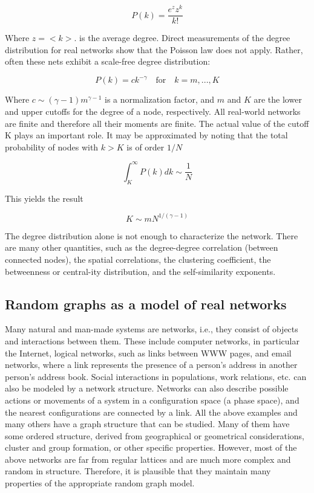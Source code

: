 \documentclass[12pt]{article}
\newcommand{\s}{\vspace*{0.4cm}}
\newcommand{\nd}{\noindent}
\begin{document}
\begin{equation}
    P(k) = \frac{e^{z} z^k}{k!}
\end{equation}

\nd Where $z = <k>$. is the average degree. \s Direct measurements of the degree distribution for real networks show that the Poisson law does not apply. Rather, often these nets exhibit a scale-free degree distribution:

\begin{equation}
    P(k) = ck^{-\gamma} \quad \text{for} \quad k = m, ... , K
\end{equation}

\nd Where $c \sim (\gamma -1)m^{\gamma - 1}$ is a normalization factor, and $m$ and $K$ are the lower and upper cutoffs for the degree of a node, respectively. All real-world networks are finite and therefore all their moments are finite. The
actual value of the cutoff K plays an important role. It may be approximated by noting that the total probability of nodes with $k > K$ is of order $1/N$

\begin{equation}
    \int_K^\infty P(k) dk \sim \frac{1}{N}
\end{equation}

\nd This yields the result

\begin{equation}
    K \sim m N^{1/(\gamma -1)}
\end{equation}

The degree distribution alone is not enough to characterize the network. There are many other quantities, such as the degree-degree correlation (between connected nodes), the spatial correlations, the clustering coefficient, the betweenness or central-ity distribution, and the self-similarity exponents.

\subsection{Random graphs as a model of real networks}

\nd Many natural and man-made systems are networks, i.e., they consist of objects and interactions between them. These include computer networks, in particular the Internet, logical networks, such as links between WWW pages, and email networks, where a link represents the presence of a person's address in another person's address book. Social interactions in populations, work relations, etc. can also be modeled by a network structure. Networks can also describe possible actions or movements of a system in a configuration space (a phase space), and the nearest configurations are connected by a link. All the above examples and many others have a graph structure that can be studied. Many of them have some ordered structure, derived from geographical or geometrical considerations, cluster and group formation, or other specific properties.  However, most of the above networks are far from regular lattices and are much more complex and random in structure. Therefore, it is plausible that they maintain many properties of the appropriate random graph model. \s
\end{document}
